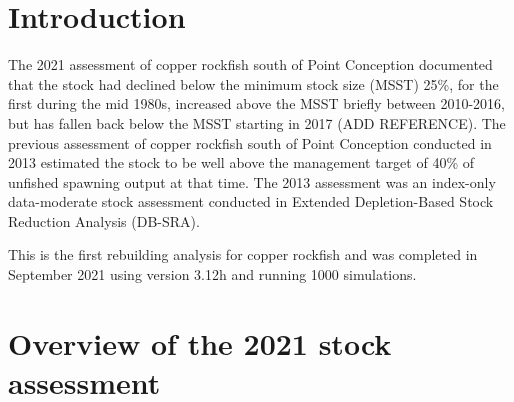 \documentclass[11pt,
  english,
  a4paper,
]{article}
\begin{document}
\pagebreak
\setlength{\parskip}{5mm plus1mm minus1mm}
\setcounter{page}{1}
\renewcommand{\thefigure}{\arabic{figure}}
\renewcommand{\thetable}{\arabic{table}}
\setcounter{table}{0}
\setcounter{figure}{0}

\setlength\parskip{0.2em plus 0.1em minus 0.2em}


\hypertarget{introduction}{%
\section{Introduction}\label{introduction}}

\leavevmode\tagmcend\tagstructend


The 2021 assessment of copper rockfish south of Point Conception documented that the stock had declined below the minimum stock size (MSST) 25\%, for the first during the mid 1980s, increased above the MSST briefly between 2010-2016, but has fallen back below the MSST starting in 2017 (ADD REFERENCE). The previous assessment of copper rockfish south of Point Conception conducted in 2013 estimated the stock to be well above the management target of 40\% of unfished spawning output at that time. The 2013 assessment was an index-only data-moderate stock assessment conducted in Extended Depletion-Based Stock Reduction Analysis (DB-SRA).

\leavevmode\tagmcend\tagstructend\par


This is the first rebuilding analysis for copper rockfish and was completed in September 2021 using version 3.12h and running 1000 simulations.

\leavevmode\tagmcend\tagstructend\par


\hypertarget{overview-of-the-2021-stock-assessment}{%
\section{Overview of the 2021 stock assessment}\label{overview-of-the-2021-stock-assessment}}

\leavevmode\tagmcend\tagstructend

\end{document}
